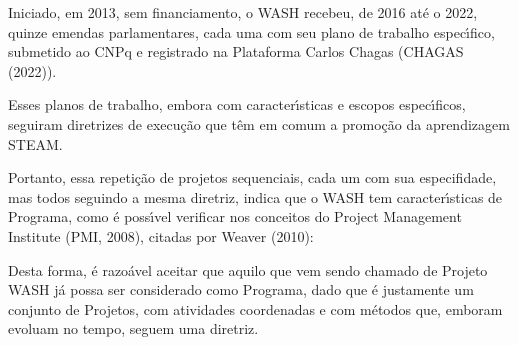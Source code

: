 \documentclass[
12pt,		%
openright,	%
twoside,  %
a4paper,			%
chapter=TITLE,		%
english,			%
french,				%
spanish,			%
brazil				%
]{USPSC-classe/USPSC}
\begin{document}
Iniciado, em 2013, sem financiamento, o WASH recebeu, de 2016 at\'e o 2022, quinze emendas parlamentares, cada uma com seu plano de trabalho espec\'{\i}fico, submetido ao CNPq e registrado na Plataforma Carlos Chagas (CHAGAS (2022)).

















Esses planos de trabalho, embora com caracter\'{\i}sticas e escopos espec\'{\i}ficos, seguiram diretrizes de execu\c{c}\~ao que t\^em em comum a promo\c{c}\~ao da aprendizagem STEAM.

















Portanto, essa repeti\c{c}\~ao de projetos sequenciais, cada um com sua especifidade, mas todos seguindo a mesma diretriz, indica que o WASH tem caracter\'{\i}sticas de Programa, como \'e poss\'{\i}vel verificar nos conceitos do Project Management Institute  (PMI, 2008), citadas por  Weaver (2010):


















\noindent\begin{center}\mbox{\centering{}}\end{center}


Desta forma, \'e razo\'avel aceitar que aquilo que vem sendo chamado de Projeto WASH j\'a possa ser considerado como Programa, dado que \'e justamente um conjunto de Projetos, com atividades coordenadas e com m\'etodos que, emboram evoluam no tempo, seguem uma diretriz.
\end{document}
